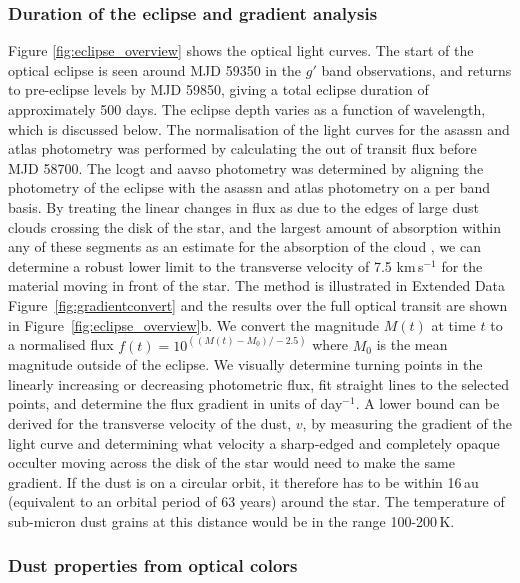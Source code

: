 \documentclass[sn-nature,oneside]{sn-jnl}%
\begin{document}
\subsubsection*{Duration of the eclipse and gradient analysis}

Figure \ref{fig:eclipse_overview} shows the optical light curves. The start of the optical eclipse is seen around MJD 59350 in the $g'$ band observations, and returns to pre-eclipse levels by MJD 59850, giving a total eclipse duration of approximately 500 days. The eclipse depth varies as a function of wavelength, which is discussed below.
%
The normalisation of the light curves for the \gls{asassn} and \gls{atlas} photometry was performed by calculating the out of transit flux before MJD 58700.
%
The \gls{lcogt} and \gls{aavso} photometry was determined by aligning the photometry of the eclipse with the \gls{asassn} and \gls{atlas} photometry on a per band basis.
%
By treating the linear changes in flux as due to the edges of large dust clouds crossing the disk of the star, and the largest amount of absorption within any of these segments as an estimate for the absorption of the cloud \citep[see equations 4.2 and 4.3 in ][]{Kennedy17}, we can determine a robust lower limit to the transverse velocity of 7.5 km\,s$^{-1}$ for the material moving in front of the star. The method is illustrated in Extended Data Figure~\ref{fig:gradientconvert} and the results over the full optical transit are shown in Figure~\ref{fig:eclipse_overview}b.
%
We convert the magnitude $M(t)$ at time $t$ to a normalised flux $f(t)=10^{\left(\left(M(t)-M_0\right)/-2.5\right)}$ where $M_0$ is the mean magnitude outside of the eclipse.
%
We visually determine turning points in the linearly increasing or decreasing photometric flux, fit straight lines to the selected points, and determine the flux gradient in units of day$^{-1}$.
%
A lower bound can be derived for the transverse velocity of the dust, $v$, by measuring the gradient of the light curve and determining what velocity a sharp-edged and completely opaque occulter moving across the disk of the star would need to make the same gradient.
%
If the dust is on a circular orbit, it therefore has to be within 16\,au (equivalent to an orbital period of 63 years) around the star. The temperature of sub-micron dust grains at this distance would be in the range 100-200\,K.

\subsubsection*{Dust properties from optical colors}
\end{document}
